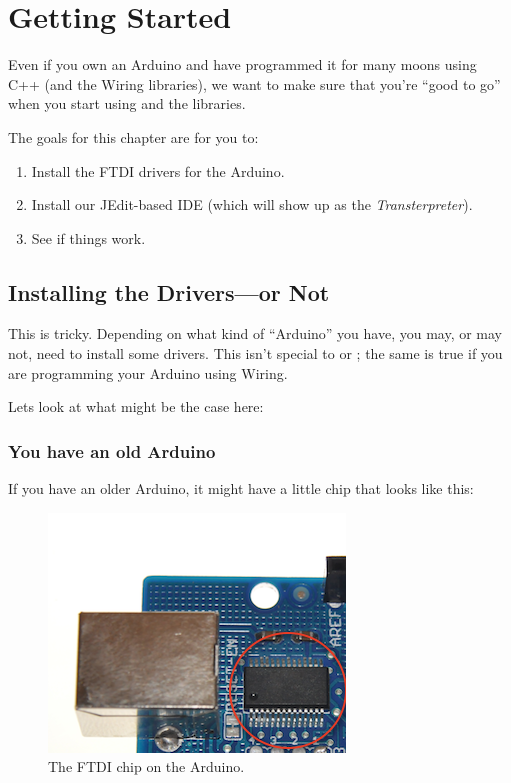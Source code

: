 \chapter{Getting Started\label{ch0}}
Even if you own an Arduino and have programmed it for many moons using C++ (and the Wiring libraries), we want to make sure that you're ``good to go'' when you start using \occam and the \plumbing libraries. 

\GOALS
The goals for this chapter are for you to:

\begin{enumerate}
	\item Install the FTDI drivers for the Arduino.
	\item Install our JEdit-based IDE (which will show up as the {\em Transterpreter}).
	\item See if things work.
\end{enumerate}

\section{Installing the Drivers---or Not}
This is tricky. Depending on what kind of ``Arduino'' you have, you may, or may not, need to install some drivers. This isn't special to \occam or \plumbing; the same is true if you are programming your Arduino using Wiring.

Lets look at what might be the case here:

\subsection{You have an old Arduino}
If you have an older Arduino, it might have a little chip that looks like this:

\begin{figure}[ht]
  \begin{center}
    \includegraphics[width=0.8\linewidth]{ch0/images/20110115-ftdi-chip}
    \caption{The FTDI chip on the Arduino.}
    \label{image:ftdi-chip}
  \end{center}
\end{figure}

